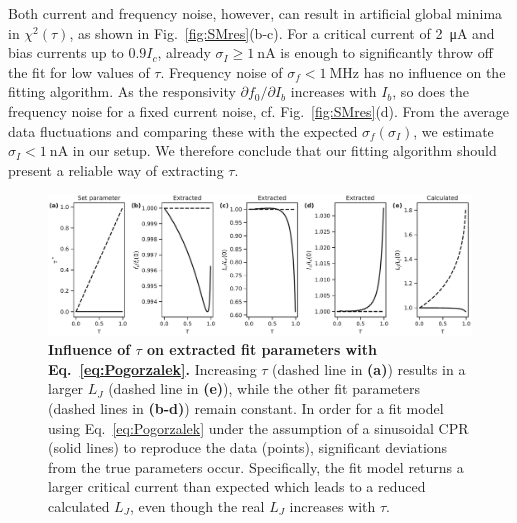 Both current and frequency noise, however, can result in artificial global minima in $\chi^2(\tau)$, as shown in Fig.~\ref{fig:SMres}(b-c).
%
For a critical current of \SI{2}{\micro\ampere} and bias currents up to $0.9I_c$, already $\sigma_I\geq\SI{1}{\nano\ampere}$ is enough to significantly throw off the fit for low values of $\tau$.
%
Frequency noise of $\sigma_f<\SI{1}{\mega\hertz}$ has no influence on the fitting algorithm.
%
As the responsivity $\partial f_0/\partial I_b$ increases with $I_b$, so does the frequency noise for a fixed current noise, cf. Fig.~\ref{fig:SMres}(d).
%
From the average data fluctuations and comparing these with the expected $\sigma_f(\sigma_I)$, we estimate $\sigma_I<\SI{1}{\nano\ampere}$ in our setup.
%
We therefore conclude that our fitting algorithm should present a reliable way of extracting $\tau$. 

\begin{figure}
	\centering
	\includegraphics[width=\linewidth]{chapter-gJJ-CPR/figs/SMFigure-tauparams}
	\caption{
		\textbf{Influence of $\tau$ on extracted fit parameters with Eq.~\ref{eq:Pogorzalek}.}
		Increasing $\tau$ (dashed line in \textbf{(a)}) results in a larger $L_J$ (dashed line in \textbf{(e)}), while the other fit parameters (dashed lines in \textbf{(b-d)}) remain constant.
		In order for a fit model using Eq.~\ref{eq:Pogorzalek} under the assumption of a sinusoidal CPR (solid lines) to reproduce the data (points), significant deviations from the true parameters occur.
		Specifically, the fit model returns a larger critical current than expected which leads to a reduced calculated $L_J$, even though the real $L_J$ increases with $\tau$.
	}
	\label{fig:SMtau}
\end{figure}

